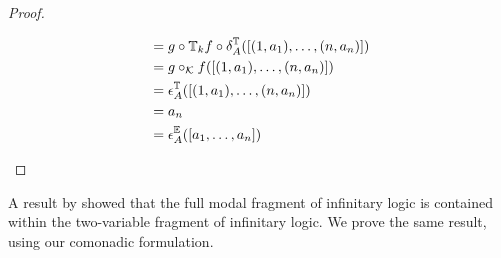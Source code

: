 \begin{prop}
\begin{proof}
\begin{enumerate}[label=(\arabic*)]
\begin{align*}
&= g \circ {\mathbb{T}_{k}f} \circ \delta^{{\mathbb{T}_{}}}_{A}([(1,a_{1}),\dots,(n,a_{n})]) \\
&= g \circ_{\mathcal{K}} f([(1,a_{1}),\dots,(n,a_{n})]) \\
&= \epsilon^{{\mathbb{T}_{}}}_{A}([(1,a_{1}),\dots,(n,a_{n})]) \\
&= a_{n} \\
&= \epsilon^{{\mathbb{E}_{}}}_{A}([a_{1},\dots,a_{n}]) \\
\end{align*}
\end{enumerate}
\end{proof}
\end{prop}
A result by \cite{Gabbay1981} showed that the full modal fragment of infinitary logic is contained within the two-variable fragment of infinitary logic. We prove the same result, using our comonadic formulation.
